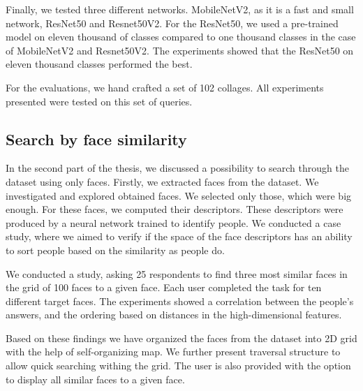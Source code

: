 

Finally, we tested three different networks. MobileNetV2, as it is a fast and small network, ResNet50 and Resnet50V2. For the ResNet50, we used a pre-trained model on eleven thousand of classes compared to one thousand classes in the case of MobileNetV2 and Resnet50V2. The experiments showed that the ResNet50 on eleven thousand classes performed the best.

For the evaluations, we hand crafted a set of 102 collages. All experiments presented were tested on this set of queries.

\subsection*{Search by face similarity}

In the second part of the thesis, we discussed a possibility to search through the dataset using only faces. Firstly, we extracted faces from the dataset. We investigated and explored obtained faces. We selected only those, which were big enough. For these faces, we computed their descriptors. These descriptors were produced by a neural network trained to identify people. We conducted a case study, where we aimed to verify if the space of the face descriptors has an ability to sort people based on the similarity as people do.

We conducted a study, asking 25 respondents to find three most similar faces in the grid of 100 faces to a given face. Each user completed the task for ten different target faces. The experiments showed a correlation between the people's answers, and the ordering based on distances in the high-dimensional features.

Based on these findings we have organized the faces from the dataset into 2D grid with the help of self-organizing map. We further present traversal structure to allow quick searching withing the grid. The user is also provided with the option to display all similar faces to a given face.

